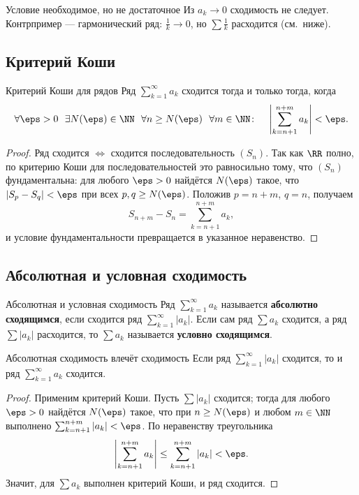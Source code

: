\begin{Remark}{Условие необходимое, но не достаточное}{}
	Из $a_k\to0$ сходимость не следует. Контрпример --- гармонический ряд:
	$\frac1k\to0$, но $\sum\frac1k$ расходится (см.\ ниже).
\end{Remark}

\subsection*{Критерий Коши}

\begin{Theorem}[required]{Критерий Коши для рядов}{}
	Ряд $\sum_{k=1}^{\infty} a_k$ сходится тогда и только тогда, когда
	\[
	\forall\eps>0\ \ \exists N(\eps)\in\NN\ \ \forall n\ge N(\eps)\ \ \forall m\in\NN
	\colon\quad
	\left|\sum_{k=n+1}^{n+m} a_k\right|<\eps.
	\]
\end{Theorem}

\begin{proof}
	Ряд сходится $\iff$ сходится последовательность $(S_n)$. Так как $\RR$
	полно, по критерию Коши для последовательностей это равносильно тому, что
	$(S_n)$ фундаментальна: для любого $\eps>0$ найдётся $N(\eps)$ такое, что
	$|S_p-S_q|<\eps$ при всех $p,q\ge N(\eps)$. Положив $p=n+m$, $q=n$, получаем
	\[
	S_{n+m}-S_n=\sum_{k=n+1}^{n+m} a_k,
	\]
	и условие фундаментальности превращается в указанное неравенство.
\end{proof}

\subsection*{Абсолютная и условная сходимость}

\begin{Definition}{Абсолютная и условная сходимость}{}
	Ряд $\sum_{k=1}^{\infty} a_k$ называется \textbf{абсолютно сходящимся},
	если сходится ряд $\sum_{k=1}^{\infty} |a_k|$. Если сам ряд $\sum a_k$
	сходится, а ряд $\sum |a_k|$ расходится, то $\sum a_k$ называется
	\textbf{условно сходящимся}.
\end{Definition}

\begin{Theorem}{Абсолютная сходимость влечёт сходимость}{}
	Если ряд $\sum_{k=1}^{\infty} |a_k|$ сходится, то и ряд
	$\sum_{k=1}^{\infty} a_k$ сходится.
\end{Theorem}

\begin{proof}
	Применим критерий Коши. Пусть $\sum |a_k|$ сходится; тогда для любого
	$\eps>0$ найдётся $N(\eps)$ такое, что при $n\ge N(\eps)$ и любом $m\in\NN$
	выполнено $\sum_{k=n+1}^{n+m}|a_k|<\eps$. По неравенству треугольника
	\[
	\left|\sum_{k=n+1}^{n+m} a_k\right|
	\le \sum_{k=n+1}^{n+m} |a_k| < \eps.
	\]
	Значит, для $\sum a_k$ выполнен критерий Коши, и ряд сходится.
\end{proof}

